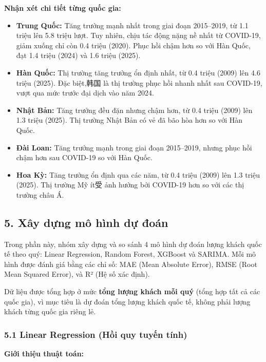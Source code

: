 \documentclass[11pt]{article}
\begin{document}
    \textbf{Nhận xét chi tiết từng quốc gia:}

\begin{itemize}
\item
  \textbf{Trung Quốc:} Tăng trưởng mạnh nhất trong giai đoạn 2015--2019,
  từ 1.1 triệu lên 5.8 triệu lượt. Tuy nhiên, chịu tác động nặng nề nhất
  từ COVID-19, giảm xuống chỉ còn 0.4 triệu (2020). Phục hồi chậm hơn so
  với Hàn Quốc, đạt 1.4 triệu (2024) và 1.6 triệu (2025).
\item
  \textbf{Hàn Quốc:} Thị trường tăng trưởng ổn định nhất, từ 0.4 triệu
  (2009) lên 4.6 triệu (2025). Đặc biệt,韩国 là thị trường phục hồi
  nhanh nhất sau COVID-19, vượt qua mức trước đại dịch vào năm 2024.
\item
  \textbf{Nhật Bản:} Tăng trưởng đều đặn nhưng chậm hơn, từ 0.4 triệu
  (2009) lên 1.3 triệu (2025). Thị trường Nhật Bản có vẻ đã bão hòa hơn
  so với Hàn Quốc.
\item
  \textbf{Đài Loan:} Tăng trưởng mạnh trong giai đoạn 2015--2019, nhưng
  phục hồi chậm hơn sau COVID-19 so với Hàn Quốc.
\item
  \textbf{Hoa Kỳ:} Tăng trưởng ổn định qua các năm, từ 0.4 triệu (2009)
  lên 1.3 triệu (2025). Thị trường Mỹ ít受 ảnh hưởng bởi COVID-19 hơn so
  với các thị trường châu Á.
\end{itemize}

    \subsection{5. Xây dựng mô hình dự
đoán}\label{xuxe2y-dux1ef1ng-muxf4-huxecnh-dux1ef1-ux111ouxe1n}

Trong phần này, nhóm xây dựng và so sánh 4 mô hình dự đoán lượng khách
quốc tế theo quý: Linear Regression, Random Forest, XGBoost và SARIMA.
Mỗi mô hình được đánh giá bằng các chỉ số: MAE (Mean Absolute Error),
RMSE (Root Mean Squared Error), và R² (Hệ số xác định).

Dữ liệu được tổng hợp ở mức \textbf{tổng lượng khách mỗi quý} (tổng hợp
tất cả các quốc gia), vì mục tiêu là dự đoán tổng lượng khách quốc tế,
không phải lượng khách từng quốc gia riêng lẻ.

\subsubsection{5.1 Linear Regression (Hồi quy tuyến
tính)}\label{linear-regression-hux1ed3i-quy-tuyux1ebfn-tuxednh}

\textbf{Giới thiệu thuật toán:}
\end{document}
